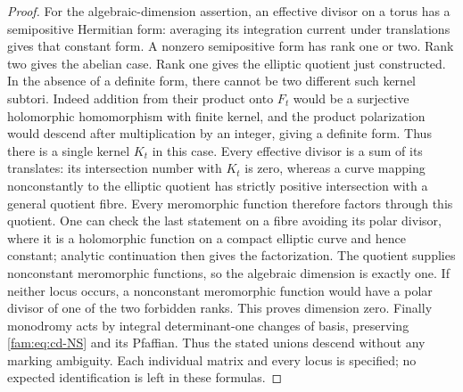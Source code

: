 \begin{proof}
For the algebraic-dimension assertion, an effective divisor on a torus
has a semipositive Hermitian form: averaging its integration current under
translations gives that constant form. A nonzero semipositive form has
rank one or two. Rank two gives the abelian case. Rank one gives the
elliptic quotient just constructed. In the absence of a definite form,
there cannot be two different such kernel subtori. Indeed addition from
their product onto $F_t$ would be a surjective holomorphic homomorphism
with finite kernel, and the product polarization would descend after
multiplication by an integer, giving a definite form. Thus there is a
single kernel $K_t$ in this case. Every effective divisor is a sum of
its translates: its intersection number with $K_t$ is zero, whereas a
curve mapping nonconstantly to the elliptic quotient has strictly positive
intersection with a general quotient fibre. Every meromorphic function
therefore factors through this quotient. One can check the last statement
on a fibre avoiding its polar divisor, where it is a holomorphic function
on a compact elliptic curve and hence constant; analytic continuation
then gives the factorization. The quotient supplies nonconstant
meromorphic functions, so the algebraic dimension is exactly one.
If neither locus occurs, a nonconstant meromorphic function would have
a polar divisor of one of the two forbidden ranks. This proves dimension
zero. Finally monodromy acts by integral determinant-one changes of basis,
preserving \eqref{fam:eq:cd-NS} and its Pfaffian. Thus the stated unions descend
without any marking ambiguity. Each individual matrix and every locus
is specified; no expected identification is left in these formulas.
\end{proof}

